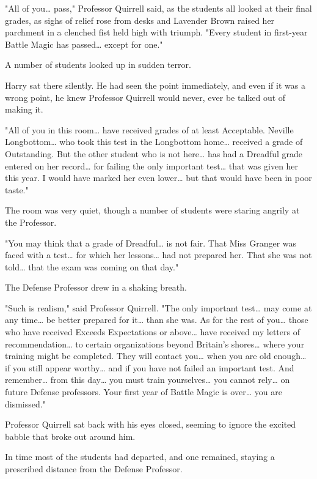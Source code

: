 "All of you{\ldots} pass," Professor Quirrell said, as the students all looked 
at their final grades, as sighs of relief rose from desks and Lavender Brown 
raised her parchment in a clenched fist held high with triumph. "Every student 
in first-year Battle Magic has passed{\ldots} except for one."

A number of students looked up in sudden terror.

Harry sat there silently. He had seen the point immediately, and even if it was 
a wrong point, he knew Professor Quirrell would never, ever be talked out of 
making it.

"All of you in this room{\ldots} have received grades of at least Acceptable. 
Neville Longbottom{\ldots} who took this test in the Longbottom home{\ldots} 
received a grade of Outstanding. But the other student who is not here{\ldots} 
has had a Dreadful grade entered on her record{\ldots} for failing the only 
important test{\ldots} that was given her this year. I would have marked her 
even lower{\ldots} but that would have been in poor taste."

The room was very quiet, though a number of students were staring angrily at 
the Professor.

"You may think that a grade of Dreadful{\ldots} is not fair. That Miss Granger 
was faced with a test{\ldots} for which her lessons{\ldots} had not prepared 
her. That she was not told{\ldots} that the exam was coming on that day."

The Defense Professor drew in a shaking breath.

"Such is realism," said Professor Quirrell. "The only important test{\ldots} 
may come at any time{\ldots} be better prepared for it{\ldots} than she was. As 
for the rest of you{\ldots} those who have received Exceeds Expectations or 
above{\ldots} have received my letters of recommendation{\ldots} to certain 
organizations beyond Britain's shores{\ldots} where your training might be 
completed. They will contact you{\ldots} when you are old enough{\ldots} if you 
still appear worthy{\ldots} and if you have not failed an important test. And 
remember{\ldots} from this day{\ldots} you must train yourselves{\ldots} you 
cannot rely{\ldots} on future Defense professors. Your first year of Battle 
Magic is over{\ldots} you are dismissed."

Professor Quirrell sat back with his eyes closed, seeming to ignore the excited 
babble that broke out around him.

In time most of the students had departed, and one remained, staying a 
prescribed distance from the Defense Professor.

